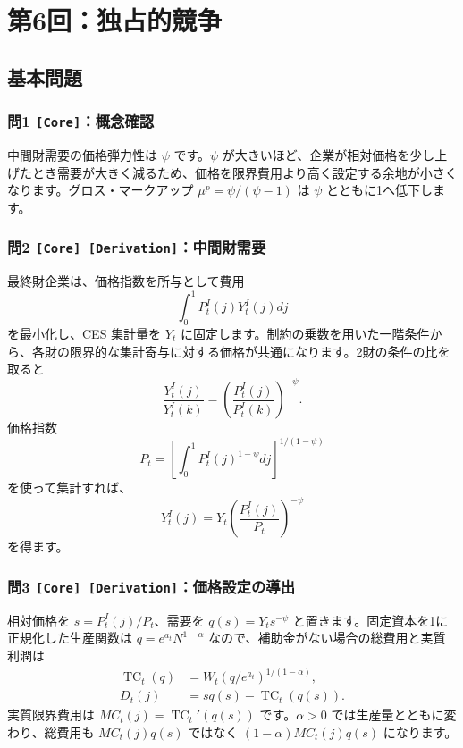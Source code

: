 \documentclass[
  japanese,
  lualatex,
  ja=standard,
  11pt,
  a4paper]{ltjsarticle}
\begin{document}
\clearpage

\section{第6回：独占的競争}\label{ux7b2c6ux56deux72ecux5360ux7684ux7af6ux4e89}

\subsection{基本問題}\label{ux57faux672cux554fux984c-5}

\subsubsection{\texorpdfstring{問1
\texttt{{[}Core{]}}：概念確認}{問1 {[}Core{]}：概念確認}}\label{ux554f1-coreux6982ux5ff5ux78baux8a8d-1}

中間財需要の価格弾力性は \(\psi\) です。\(\psi\)
が大きいほど、企業が相対価格を少し上げたとき需要が大きく減るため、価格を限界費用より高く設定する余地が小さくなります。グロス・マークアップ
\(\mu^p=\psi/(\psi-1)\) は \(\psi\) とともに1へ低下します。

\subsubsection{\texorpdfstring{問2
\texttt{{[}Core{]}\ {[}Derivation{]}}：中間財需要}{問2 {[}Core{]} {[}Derivation{]}：中間財需要}}\label{ux554f2-core-derivationux4e2dux9593ux8ca1ux9700ux8981}

最終財企業は、価格指数を所与として費用 \[
\int_0^1P_t^I(j)Y_t^I(j)dj
\] を最小化し、CES 集計量を \(Y_t\)
に固定します。制約の乗数を用いた一階条件から、各財の限界的な集計寄与に対する価格が共通になります。2財の条件の比を取ると
\[
\frac{Y_t^I(j)}{Y_t^I(k)}
=\left(\frac{P_t^I(j)}{P_t^I(k)}\right)^{-\psi}.
\] 価格指数 \[
P_t=\left[\int_0^1P_t^I(j)^{1-\psi}dj\right]^{1/(1-\psi)}
\] を使って集計すれば、 \[
Y_t^I(j)=Y_t\left(\frac{P_t^I(j)}{P_t}\right)^{-\psi}
\] を得ます。

\subsubsection{\texorpdfstring{問3
\texttt{{[}Core{]}\ {[}Derivation{]}}：価格設定の導出}{問3 {[}Core{]} {[}Derivation{]}：価格設定の導出}}\label{ux554f3-core-derivationux4fa1ux683cux8a2dux5b9aux306eux5c0eux51fa}

相対価格を \(s=P_t^I(j)/P_t\)、需要を \(q(s)=Y_ts^{-\psi}\)
と置きます。固定資本を1に正規化した生産関数は \(q=e^{a_t}N^{1-\alpha}\)
なので、補助金がない場合の総費用と実質利潤は \[
\begin{aligned}
\operatorname{TC}_t(q)
&=W_t(q/e^{a_t})^{1/(1-\alpha)},\\
D_t(j)&=s q(s)-\operatorname{TC}_t(q(s)).
\end{aligned}
\] 実質限界費用は \(MC_t(j)=\operatorname{TC}_t'(q(s))\)
です。\(\alpha>0\) では生産量とともに変わり、総費用も \(MC_t(j)q(s)\)
ではなく \((1-\alpha)MC_t(j)q(s)\) になります。
\end{document}
